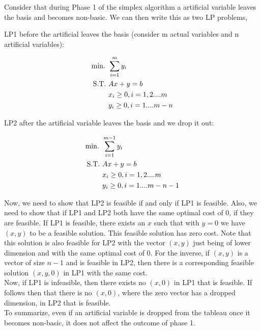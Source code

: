 Consider that during Phase 1 of the simplex algorithm a artificial variable leaves the basis and becomes non-basic. We can then write this as two LP problems, 

LP1 before the artificial leaves the basis (consider m actual variables and n artificial variables):

\begin{align}
    \text{min. } &\sum_{i=1}^{m}y_i \notag\\
    \text{S.T. } &Ax + y = b \notag\\
    &x_i \ge 0, i = 1,2....m \notag\\
    &y_i \ge 0, i = 1....m-n \notag\\
\end{align}

LP2 after the artificial variable leaves the basis and we drop it out:

\begin{align}
    \text{min. } &\sum_{i=1}^{m-1}y_i \notag\\
    \text{S.T. } &Ax + y = b \notag\\
    &x_i \ge 0, i = 1,2....m \notag\\
    &y_i \ge 0, i = 1....m-n-1 \notag\\
\end{align}

Now, we need to show that LP2 is feasible if and only if LP1 is feasible. Also, we need to show that if LP1 and LP2 both have the same optimal cost of 0, if they are feasible. 
If LP1 is feasible, there exists an $x$ such that with $y=0$ we have $(x,y)$ to be a feasible solution. This feasible solution has zero cost. Note that this solution is also feasible for LP2 with the vector $(x,y)$ just being of lower dimension and with the same optimal cost of 0. For the inverse, if $(x,y)$ is a vector of size $n-1$ and is feasible in LP2, then there is a corresponding feasible solution $(x,y,0)$ in LP1 with the same cost. \\

Now, if LP1 is infeasible, then there exists no $(x,0)$ in LP1 that is feasible. If follows then that there is no $(x,0)$, where the zero vector has a dropped dimension, in LP2 that is feasible. \\

To summarize, even if an artificial variable is dropped from the tableau once it becomes non-basic, it does not affect the outcome of phase 1. 
